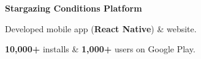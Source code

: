\textbf{Stargazing Conditions Platform}

	\begin{items}
		\item Developed mobile app (\textbf{React Native}) \& website.
		\item \textbf{10,000+} installs \& \textbf{1,000+} users on Google Play.
	\end{items}